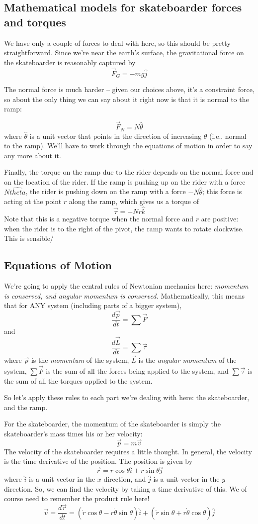 \subsection{Mathematical models for skateboarder forces and torques}

We have only a couple of forces to deal with here, so this should be pretty straightforward.
Since we're near the earth's surface, the gravitational force on the skateboarder is  reasonably captured by 
$$\vec{F}_{G} = -m g \hat{j}$$

The normal force is much harder -- given our choices above, it's a constraint force, so about the only thing we can say about it right now is that it is normal to the ramp:

$$\vec{F}_N = N \hat{\theta}$$
where $\hat{\theta}$ is a unit vector that points in the direction of increasing $\theta$ (i.e., normal to the ramp).  We'll have to work through the equations of motion in order to say any more about it.

Finally, the torque on the ramp due to the rider depends on the normal force and on the location of the rider.  If the ramp is pushing up on the rider with a force $N\hat{theta}$, the rider is pushing down on the ramp with a force $-N \hat{\theta}$; this force is acting at the point $r$ along the ramp, which gives us a torque of 
$$\vec{\tau} = -N r \hat{k}$$
Note that this is a negative torque when the normal force and $r$ are positive: when the rider is to the right of the pivot, the ramp wants to rotate clockwise.  This is sensible/

\subsection{Equations of Motion}

We're going to apply the central rules of Newtonian mechanics here:  {\em momentum is conserved, and angular momentum is conserved.}  Mathematically, this means that for ANY system (including parts of a bigger system),
$$\frac{d\vec{p}}{dt} = \sum \vec{F}$$
and
$$\frac{d\vec{L}}{dt} = \sum \vec{\tau}$$
where $\vec{p}$ is the {\it momentum} of the system, $\vec{L}$ is the {\it angular momentum} of the system, $\sum \vec{F}$ is the sum of all the forces being applied to the system, and $\sum \vec{\tau}$ is the sum of all the torques applied to the system.

So let's apply these rules to each part we're dealing with here: the skateboarder, and the ramp.

For the skateboarder, the momentum of the skateboarder is simply the skateboarder's mass times his or her velocity:
$$\vec{p} = m\vec{v}$$
The velocity of the skateboarder requires a little thought.  In general, the velocity is the time derivative of the position. The position is given by 
$$\vec{r} = r \cos \theta \hat{i} + r \sin \theta \hat{j}$$
where $\hat{i}$ is a unit vector in the $x$ direction, and $\hat{j}$ is a unit vector in the $y$ direction.  So, we can find the velocity by taking a time derivative of this.  We of course need to remember the product rule here!
$$\vec{v} = \frac{d\vec{r}}{dt} = (\dot{r} \cos \theta  - r \dot{\theta} \sin{\theta}) \hat{i}+ (\dot{r} \sin \theta + r \dot{\theta} \cos{\theta}) \hat{j}$$


